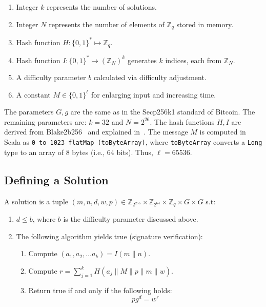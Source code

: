 \documentclass[11pt]{article}
\begin{document}
\begin{enumerate}
	\item Integer $k$ represents the number of solutions.
	\item Integer $N$ represents the number of elements of $\mathbb{Z}_q$ stored in memory.
	\item Hash function $H:\{0,1\}^* \mapsto \mathbb{Z}_q$. 
	\item Hash function $I:\{0,1\}^* \mapsto {(\mathbb{Z}_N)}^k$ generates $k$ indices, each from $\mathbb{Z}_N$. %
	\item A difficulty parameter $b$ calculated via difficulty adjustment.
	\item A constant $M\in\{0, 1\}^\ell$ for enlarging input and increasing time.
\end{enumerate}

The parameters $G, g$ are the same as in the Secp256k1 standard of Bitcoin. The remaining parameters are: 
$k = 32$ and $N = 2^{26}$. The hash functions $H, I$ are derived from Blake2b256~\cite{rfc7693} and explained in~\cite{autolykos}. The message $M$ is computed in Scala as \texttt{0 to 1023 flatMap (toByteArray)}, where \texttt{toByteArray} converts a \texttt{Long} type to an array of 8 bytes (i.e., 64 bits). Thus, $\ell = 65536$.

\subsection{Defining a Solution}

A solution is a tuple $(m, n, d, w, p) \in \mathbb{Z}_{2^{256}} \times \mathbb{Z}_{2^{64}}\times \mathbb{Z}_{q}\times G \times G$ s.t: 
\begin{enumerate}
	\item $d \leq b$, where $b$ is the difficulty parameter discussed above.
	\item The following algorithm yields true (signature verification):
	\begin{enumerate}
		\item Compute $(a_1, a_2, \ldots a_k) = I(m\|n)$.
		\item Compute $r = \sum^{k}_{j=1}H(a_j\|M\|{p}\|m\|w)$.
		\item Return true if and only if the following holds: 
		\begin{equation}
		\label{verif}
		{p}g^d = w^r
		\end{equation} 		
	\end{enumerate}
\end{enumerate}
\end{document}
